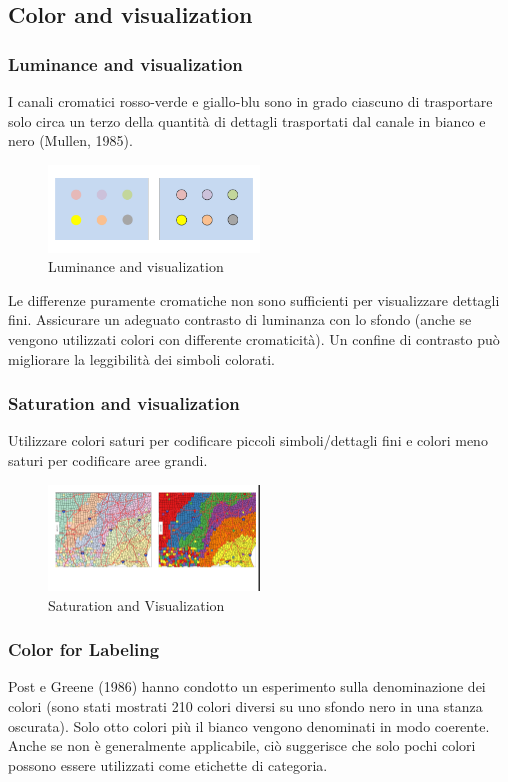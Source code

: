 \subsection{Color and visualization}
\subsubsection{Luminance and visualization}
I canali cromatici rosso-verde e giallo-blu sono in grado ciascuno di trasportare 
solo circa un terzo della quantità di dettagli trasportati dal canale in bianco e nero (Mullen, 1985). 
\begin{figure}[H]
    \centering
    \includegraphics[width=0.5\textwidth]{images/Luminance.png} 
    \caption{Luminance and visualization}
    \label{fig:immagine}
\end{figure}
Le differenze puramente cromatiche non sono sufficienti per visualizzare dettagli fini. Assicurare un adeguato contrasto di luminanza con lo sfondo (anche se vengono utilizzati colori con differente cromaticità).
Un confine di contrasto può migliorare la leggibilità dei simboli colorati.
\subsubsection{Saturation and visualization}
Utilizzare colori saturi per codificare piccoli simboli/dettagli fini e colori meno saturi per codificare aree grandi.
\begin{figure}[H]
    \centering
    \includegraphics[width=0.5\textwidth]{images/Saturation.png} 
    \caption{Saturation and Visualization}
    \label{fig:immagine}
\end{figure}
\subsubsection{Color for Labeling}
Post e Greene (1986) hanno condotto un esperimento sulla denominazione dei colori (sono stati mostrati 210 colori diversi su uno sfondo nero in una stanza oscurata). Solo otto colori più il bianco vengono denominati in modo coerente. Anche se non è generalmente applicabile,
ciò suggerisce che solo pochi colori possono essere utilizzati come etichette di categoria.

